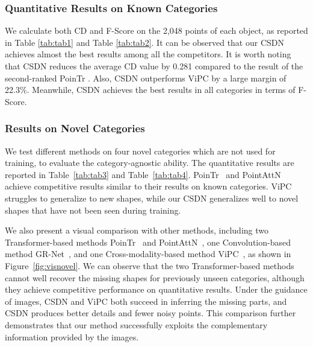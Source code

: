 \subsubsection{Quantitative Results on Known Categories}
We calculate both CD and F-Score on the 2,048 points of each object, as reported in Table \ref{tab:tab1} and Table \ref{tab:tab2}. It can be observed that our CSDN achieves almost the best results among all the competitors. It is worth noting that CSDN reduces the average CD value by 0.281 compared to the result of the second-ranked PoinTr \cite{yu2021pointr}. Also, CSDN outperforms ViPC \cite{zhang2021view} by a large margin of 22.3\%. Meanwhile, CSDN achieves the best results in all categories in terms of F-Score. 
    
\subsubsection{Results on Novel Categories}
We test different methods on four novel categories which are not used for training, to evaluate the category-agnostic ability. The quantitative results are reported in Table~\ref{tab:tab3} and Table~\ref{tab:tab4}. PoinTr~\cite{yu2021pointr} and PointAttN~\cite{wang2022pointattn} achieve competitive results similar to their results on known categories. ViPC~\cite{zhang2021view} struggles to generalize to new shapes, while our CSDN generalizes well to novel shapes that have not been seen during training.

We also present a visual comparison with other methods, including two Transformer-based methods PoinTr~\cite{yu2021pointr} and PointAttN~\cite{wang2022pointattn}, one Convolution-based method GR-Net~\cite{xie2020grnet}, and one Cross-modality-based method ViPC~\cite{zhang2021view}, as shown in Figure~\ref{fig:visnovel}. We can observe that the two Transformer-based methods cannot well recover the missing shapes for previously unseen categories, although they achieve competitive performance on quantitative results. Under the guidance of images, CSDN and ViPC both succeed in inferring the missing parts, and CSDN produces better details and fewer noisy points. This comparison further demonstrates that our method successfully exploits the complementary information provided by the images.


